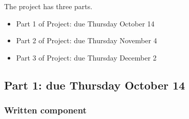 \documentclass[12pt, oneside]{article}
\begin{document}
The project has three parts. 
\begin{itemize}
    \item Part 1 of Project: due Thursday October 14
    \item Part 2 of Project: due Thursday November 4
    \item Part 3 of Project: due Thursday December 2
\end{itemize}

\newpage
\subsection*{Part 1: due Thursday October 14}
\subsubsection*{Written component}
\end{document}
